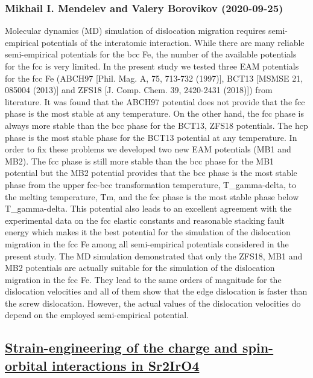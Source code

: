 \subsubsection*{Mikhail I. Mendelev and Valery Borovikov (2020-09-25)}
Molecular dynamics (MD) simulation of dislocation migration requires
semi-empirical potentials of the interatomic interaction. While there are many
reliable semi-empirical potentials for the bcc Fe, the number of the available
potentials for the fcc is very limited. In the present study we tested three
EAM potentials for the fcc Fe (ABCH97 [Phil. Mag. A, 75, 713-732 (1997)], BCT13
[MSMSE 21, 085004 (2013)] and ZFS18 [J. Comp. Chem. 39, 2420-2431 (2018)]) from
literature. It was found that the ABCH97 potential does not provide that the
fcc phase is the most stable at any temperature. On the other hand, the fcc
phase is always more stable than the bcc phase for the BCT13, ZFS18 potentials.
The hcp phase is the most stable phase for the BCT13 potential at any
temperature. In order to fix these problems we developed two new EAM potentials
(MB1 and MB2). The fcc phase is still more stable than the bcc phase for the
MB1 potential but the MB2 potential provides that the bcc phase is the most
stable phase from the upper fcc-bcc transformation temperature, T\_gamma-delta,
to the melting temperature, Tm, and the fcc phase is the most stable phase
below T\_gamma-delta. This potential also leads to an excellent agreement with
the experimental data on the fcc elastic constants and reasonable stacking
fault energy which makes it the best potential for the simulation of the
dislocation migration in the fcc Fe among all semi-empirical potentials
considered in the present study. The MD simulation demonstrated that only the
ZFS18, MB1 and MB2 potentials are actually suitable for the simulation of the
dislocation migration in the fcc Fe. They lead to the same orders of magnitude
for the dislocation velocities and all of them show that the edge dislocation
is faster than the screw dislocation. However, the actual values of the
dislocation velocities do depend on the employed semi-empirical potential.

\subsection*{\href{http://arxiv.org/abs/2009.12262v1}{Strain-engineering of the charge and spin-orbital interactions in  Sr2IrO4}}
